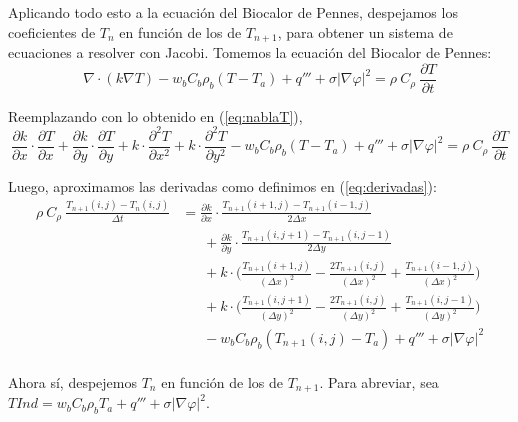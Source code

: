 \documentclass[a4paper]{article}
\begin{document}
Aplicando todo esto a la ecuación del Biocalor de Pennes, despejamos los coeficientes de $T_n$ en función de los de $T_{n+1}$, para obtener un sistema de ecuaciones a resolver con Jacobi. Tomemos la ecuación del Biocalor de Pennes:
$$\nabla \cdot (k \nabla T) - w_b C_b \rho_b (T-T_a) + q''' + \sigma |\nabla \varphi|^2 = \rho \ C_\rho \ \frac{\partial T}{\partial t}$$

Reemplazando con lo obtenido en (\ref{eq:nablaT}),
$$ \frac{\partial k}{\partial x} \cdot \frac{\partial T}{\partial x} + \frac{\partial k}{\partial y} \cdot \frac{\partial T}{\partial y} + k \cdot \frac{\partial^2 T}{\partial x^2} + k \cdot \frac{\partial^2 T}{\partial y^2} - w_b C_b \rho_b (T-T_a) + q''' + \sigma |\nabla \varphi|^2 = \rho \ C_\rho \ \frac{\partial T}{\partial t}$$

Luego, aproximamos las derivadas como definimos en (\ref{eq:derivadas}):\\
\begin{equation*}
\begin{aligned}
\rho \ C_\rho \ \frac{T_{n+1}(i,j) - T_n(i,j)}{\Delta t} &= \frac{\partial k}{\partial x} \cdot \frac{T_{n+1}(i+1,j) - T_{n+1}(i-1,j)}{2\Delta x} \\ & \ \ \ \ \ \ \  + \frac{\partial k}{\partial y} \cdot \frac{T_{n+1}(i,j+1) - T_{n+1}(i,j-1)}{2\Delta y} \\ & \ \ \ \ \ \ \ + k \cdot \bigg(\frac{T_{n+1}(i+1,j)}{(\Delta x)^2} - \frac{2 T_{n+1}(i,j)}{(\Delta x)^2} + \frac{T_{n+1}(i-1,j)}{(\Delta x)^2}\bigg) \\ & \ \ \ \ \ \ \  + k \cdot \bigg(\frac{T_{n+1}(i,j+1)}{(\Delta y)^2} - \frac{2 T_{n+1}(i,j)}{(\Delta y)^2} + \frac{T_{n+1}(i,j-1)}{(\Delta y)^2}\bigg) \\ & \ \ \ \ \ \ \  -  w_b C_b \rho_b (T_{n+1}(i,j)-T_a) + q''' + \sigma |\nabla \varphi|^2\\
\end{aligned}
\end{equation*}

\bigskip
Ahora sí, despejemos $T_n$ en función de los de $T_{n+1}$. Para abreviar, sea $TInd = w_b C_b \rho_b T_a + q''' + \sigma |\nabla \varphi|^2$. \\
\end{document}

